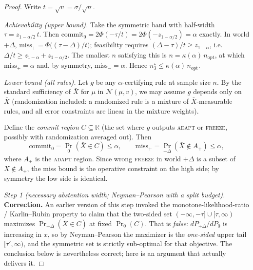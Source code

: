 \begin{proof}
Write $t=\sqrt v=\sigma/\sqrt n$.

\emph{Achievability (upper bound).}  Take the symmetric band with half-width
$\tau=z_{1-\alpha/2}\,t$.  Then
$\mathrm{commit}_0=2\Phi(-\tau/t)=2\Phi(-z_{1-\alpha/2})=\alpha$ exactly.  In world $+\Delta$,
$\mathrm{miss}_+=\Phi\bigl((\tau-\Delta)/t\bigr)$; feasibility requires
$(\Delta-\tau)/t\ge z_{1-\alpha}$, i.e.\ $\Delta/t\ge z_{1-\alpha}+z_{1-\alpha/2}$.  The smallest $n$
satisfying this is $n=\kappa(\alpha)\,n_{\mathrm{opt}}$, at which $\mathrm{miss}_+=\alpha$ and,
by symmetry, $\mathrm{miss}_-=\alpha$.  Hence $n^\star_{3}\le\kappa(\alpha)\,n_{\mathrm{opt}}$.

\emph{Lower bound (all rules).}  Let $g$ be any $\alpha$-certifying rule at sample size $n$.
By the standard sufficiency of $\bar X$ for $\mu$ in $\mathcal N(\mu,v)$, we may assume $g$
depends only on $\bar X$ (randomization included: a randomized rule is a mixture of
$\bar X$-measurable rules, and all error constraints are linear in the mixture weights).

Define the \emph{commit region} $C\subseteq\mathbb R$ (the set where $g$ outputs
\textsc{adapt} or \textsc{freeze}, possibly with randomization averaged out).  Then
\[
  \mathrm{commit}_0=\Pr_0(\bar X\in C)\le\alpha,\qquad
  \mathrm{miss}_+=\Pr_{+\Delta}(\bar X\notin A_+)\le\alpha,
\]
where $A_+$ is the \textsc{adapt} region.  Since wrong \textsc{freeze} in world $+\Delta$ is a
subset of $\bar X\notin A_+$, the miss bound is the operative constraint on the high side; by
symmetry the low side is identical.

\emph{Step 1 (necessary abstention width; Neyman--Pearson with a split budget).}
\textbf{Correction.}  An earlier version of this step invoked the monotone-likelihood-ratio /
Karlin--Rubin property to claim that the two-sided set
$(-\infty,-\tau]\cup[\tau,\infty)$ maximizes $\Pr_{+\Delta}(\bar X\in C)$ at fixed $\Pr_0(C)$.
That is \emph{false}: $dP_{+\Delta}/dP_0$ is increasing in $x$, so by Neyman--Pearson the
maximizer is the \emph{one-sided} upper tail $[\tau',\infty)$, and the symmetric set is strictly
sub-optimal for that objective.  The conclusion below is nevertheless correct; here is an argument
that actually delivers it.


\end{proof}
